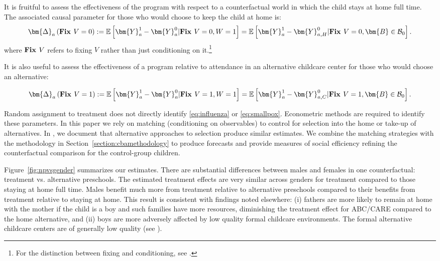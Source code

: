 \noindent It is fruitful to assess the effectiveness of the program with respect to a counterfactual world in which the child stays at home full time. The associated causal parameter for those who would choose to keep the child at home is:
\begin{equation}\label{eq:influenza}
\bm{\Delta}_a \left(\text{\textbf{Fix }} V = 0 \right) :=   \mathbb{E} \left[ \bm{Y}^1_a - \bm{Y}^0_a | \text{\textbf{Fix }} V = 0, W = 1 \right] = \mathbb{E} \left[\bm{Y}^1_{a} - \bm{Y}^0_{a,H} | \text{\textbf{Fix }} V = 0, \bm{B} \in \mathcal{B}_0 \right].
\end{equation}
where $\text{\textbf{Fix }} V$ refers to fixing $V$ rather than just conditioning on it.\footnote{For the distinction between fixing and conditioning, see \cite{Heckman_Pinto_2015_EconometTheory}.}

\noindent It is also useful to assess the effectiveness of a program relative to attendance in an alternative childcare center for those who would choose an alternative:

\begin{equation}\label{eq:smallpox}
\bm{\Delta}_a \left(\text{\textbf{Fix }} V =1 \right) :=   \mathbb{E} \left[ \bm{Y}^1_a - \bm{Y}^0_a | \text{\textbf{Fix }} V = 1, W = 1 \right] = \mathbb{E} \left[\bm{Y}^1_a - \bm{Y}^0_{a,C} | \text{\textbf{Fix }} V = 1, \bm{B} \in \mathcal{B}_0 \right].
\end{equation}

\noindent Random assignment to treatment does not directly identify \eqref{eq:influenza} or \eqref{eq:smallpox}. Econometric methods are required to identify these parameters. In this paper we rely on matching (conditioning on observables) to control for selection into the home or take-up of alternatives. In \cite{Garcia_Heckman_Ziff_2018_EER}, we document that alternative approaches to selection produce similar estimates. We combine the matching strategies with the methodology in Section~\ref{section:cbamethodology} to produce forecasts and provide measures of social efficiency refining the counterfactual comparison for the control-group children.

\noindent Figure~\ref{fig:npvsgender} summarizes our estimates. There are substantial differences between males and females in one counterfactual: treatment vs. alternative preschools. The estimated treatment effects are very similar across genders for treatment compared to those staying at home full time. Males benefit much more from treatment relative to alternative preschools compared to their benefits from treatment relative to staying at home. This result is consistent with findings noted elsewhere: (i) fathers are more likely to remain at home with the mother if the child is a boy and such families have more resources, diminishing the treatment effect for ABC/CARE compared to the home alternative, and (ii) boys are more adversely affected by low quality formal childcare environments. The formal alternative childcare centers are of generally low quality (see \citealp{Garcia_Heckman_Ziff_2018_EER}).

